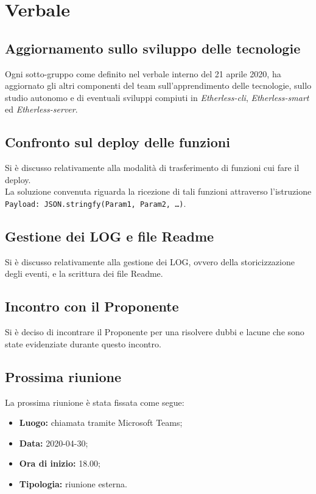 \section{Verbale}

	\subsection{Aggiornamento sullo sviluppo delle tecnologie}
		Ogni sotto-gruppo come definito nel verbale interno del 21 aprile 2020, ha aggiornato gli altri componenti del team sull'apprendimento delle tecnologie, sullo studio autonomo e di eventuali sviluppi compiuti in \textit{Etherless-cli}, \textit{Etherless-smart} ed \textit{Etherless-server}. 
	
	\subsection{Confronto sul deploy delle funzioni}
		Si è discusso relativamente alla modalità di trasferimento di funzioni cui fare il deploy.\\
		La soluzione convenuta riguarda la ricezione di tali funzioni attraverso l'istruzione \texttt{Payload: JSON.stringfy(Param1, Param2, …)}.
		
	\subsection{Gestione dei LOG e file Readme}
		Si è discusso relativamente alla gestione dei LOG, ovvero della storicizzazione degli eventi, e la scrittura dei file Readme.
	
	\subsection{Incontro con il Proponente}
		Si è deciso di incontrare il Proponente per una risolvere dubbi e lacune che sono state evidenziate durante questo incontro.
	
	\subsection{Prossima riunione}
		La prossima riunione è stata fissata come segue:
		\begin{itemize}
			\item \textbf{Luogo: } chiamata tramite Microsoft Teams; 
			\item \textbf{Data: } 2020-04-30;
			\item \textbf{Ora di inizio: } 18.00;
			\item \textbf{Tipologia: } riunione esterna.
		\end{itemize}
